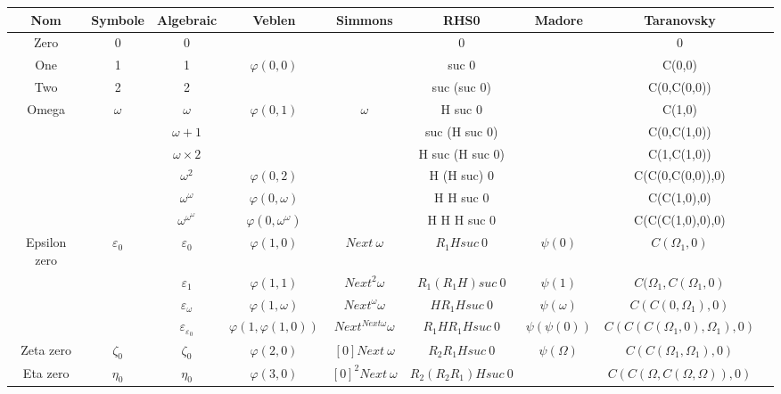 \documentclass[8pt]{article}
\begin{document}
\begin{tabular}{|c|c|c|c|c|c|c|c|c|}
\hline
Nom		& Symbole		& Algebraic			& Veblen			& Simmons			& RHS0 		& Madore				& Taranovsky 			\\
\hline
Zero		& 0			& 0				& 				& 				& 0			& 					& 0				\\ \hline
One		& 1			& 1				& \(\varphi(0,0)\)		& 				& suc 0			& 					& C(0,0)			\\ \hline
Two		& 2			& 2				& 				& 				& suc (suc 0)		& 					& C(0,C(0,0))			\\ \hline
Omega		& \(\omega\)		& \(\omega\)			& \(\varphi(0,1)\)		& \(\omega\)			& H suc 0		& 					& C(1,0)			\\ \hline
		& 			& \(\omega+1\)			& 				& 				& suc (H suc 0)		& 					& C(0,C(1,0))			\\ \hline
		&			& \(\omega\times2\)		&				& 				& H suc (H suc 0)	& 					& C(1,C(1,0))			\\ \hline
		&			& \(\omega^2\)			& \(\varphi(0,2)\)		& 				& H (H suc) 0		& 					& C(C(0,C(0,0)),0)		\\ \hline
		&			& \(\omega^\omega\)		& \(\varphi(0,\omega)\)		& 				& H H suc 0		& 					& C(C(1,0),0)			\\ \hline
		&			& \(\omega^{\omega^\omega}\)	& \(\varphi(0,\omega^\omega)\)	&				& H H H suc 0		&					& C(C(C(1,0),0),0)		\\ \hline
Epsilon zero	& \(\varepsilon_0\)	& \(\varepsilon_0\)		& \(\varphi(1,0)\)		& \(Next\ \omega\)		& \(R_1 H suc\ 0\)	& \(\psi(0)\)				& \(C(\Omega_1,0)\)		\\ \hline
		& 			& \(\varepsilon_1\)		& \(\varphi(1,1)\)		& \(Next^2 \omega\)	& \(R_1 (R_1 H) suc\ 0\)& \(\psi(1)\)				& \(C(\Omega_1,C(\Omega_1,0)\)	\\ \hline
		& 			& \(\varepsilon_\omega\)	& \(\varphi(1,\omega)\) 	& \(Next^\omega \omega\) & \(H R_1 H suc\ 0\)	& \(\psi(\omega)\)			& \(C(C(0,\Omega_1),0)\)	\\ \hline
		& 			&\(\varepsilon_{\varepsilon_0}\)& \(\varphi(1,\varphi(1,0))\)	& \(Next^{Next \omega} \omega \) & \(R_1 H R_1 H suc\ 0\)& \(\psi(\psi(0))\)			& \(C(C(C(\Omega_1,0),\Omega_1),0)\)\\ \hline
Zeta zero	& \(\zeta_0\)		& \(\zeta_0\)			& \(\varphi(2,0)\)		& \([0] Next\ \omega\)		& \(R_2 R_1 H suc\ 0\)	& \(\psi(\Omega)\)			& \(C(C(\Omega_1,\Omega_1),0)\)	\\ \hline
Eta zero	& \(\eta_0\)		& \(\eta_0\)			& \(\varphi(3,0)\)		& \([0]^2 Next\ \omega\) 	& \(R_2 (R_2 R_1) H suc\ 0\)&					& \(C(C(\Omega,C(\Omega,\Omega)),0)\) \\ \hline

\end{tabular}
\end{document}
